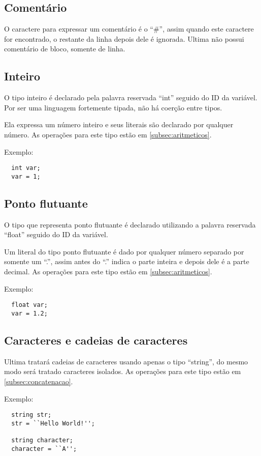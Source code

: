 \documentclass[a4paper, 11pt, article]{memoir}
\begin{document}
\subsection{Comentário}
\label{subsec:comentario}
O caractere para expressar um comentário é o ``\#'', assim quando este caractere
for encontrado, o restante da linha depois dele é ignorada.
Ultima não possui comentário de bloco, somente de linha.

\subsection{Inteiro}
\label{subsec:inteiro}
O tipo inteiro é declarado pela palavra reservada ``int'' seguido do ID da
variável. Por ser uma linguagem fortemente tipada, não há coerção entre tipos.

Ela expressa um número inteiro e seus literais são declarado por qualquer
número. As operações para este tipo estão em \ref{subsec:aritmeticos}.

Exemplo:
\begin{lstlisting}
  int var;
  var = 1;
\end{lstlisting}

\subsection{Ponto flutuante}
\label{subsec:float}
O tipo que representa ponto flutuante é declarado utilizando a palavra reservada
``float'' seguido do ID da variável.

Um literal do tipo ponto flutuante é dado por qualquer número separado por
somente um ``.'', assim antes do ``.'' indica o parte inteira e depois dele é a
parte decimal. As operações para este tipo estão em \ref{subsec:aritmeticos}.

Exemplo:
\begin{lstlisting}
  float var;
  var = 1.2;
\end{lstlisting}

\subsection{Caracteres e cadeias de caracteres}
\label{subsec:string}
Ultima tratará cadeias de caracteres usando apenas o tipo ``string'', do mesmo
modo será tratado caracteres isolados. As operações para este tipo estão em
\ref{subsec:concatenacao}.

Exemplo:
\begin{lstlisting}
  string str;
  str = ``Hello World!'';

  string character;
  character = ``A'';
\end{lstlisting}
\end{document}
